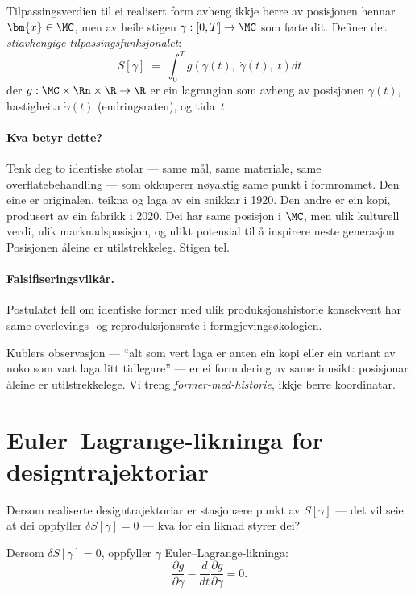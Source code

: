 \begin{postmark}\label{post:L.8.1}
Tilpassingsverdien til ei realisert form avheng ikkje berre av
posisjonen hennar $\bm{x} \in \MC$, men av heile stigen
$\gamma : [0, T] \to \MC$ som førte dit. Definer det
\emph{stiavhengige tilpassingsfunksjonalet}:
\[
  S[\gamma] \;=\; \int_0^T
    g\!\left(\gamma(t),\; \dot{\gamma}(t),\; t\right) dt
\]
der $g : \MC \times \Rn \times \R \to \R$ er ein lagrangian som
avheng av posisjonen $\gamma(t)$, hastigheita
$\dot{\gamma}(t)$ (endringsraten), og tida~$t$.
\end{postmark}

\paragraph{Kva betyr dette?}
Tenk deg to identiske stolar --- same mål, same materiale, same
overflatebehandling --- som okkuperer nøyaktig same punkt i
formrommet. Den eine er originalen, teikna og laga av ein
snikkar i 1920. Den andre er ein kopi, produsert av ein fabrikk
i 2020. Dei har same posisjon i $\MC$, men ulik kulturell verdi,
ulik marknadsposisjon, og ulikt potensial til å inspirere neste
generasjon. Posisjonen åleine er utilstrekkeleg. Stigen tel.

\paragraph{Falsifiseringsvilkår.}
Postulatet fell om identiske former med ulik produksjonshistorie
konsekvent har same overlevings- og reproduksjonsrate i
formgjevingsøkologien.

\medskip
Kublers observasjon --- ``alt som vert laga er anten ein kopi eller
ein variant av noko som vart laga litt tidlegare'' --- er ei
formulering av same innsikt: posisjonar åleine er utilstrekkelege.
Vi treng \emph{former-med-historie}, ikkje berre koordinatar.


\section{Euler--Lagrange-likninga for designtrajektoriar}

Dersom realiserte designtrajektoriar er stasjonære punkt av
$S[\gamma]$ --- det vil seie at dei oppfyller $\delta S[\gamma] = 0$
--- kva for ein liknad styrer dei?

\begin{satmark}\label{thm:L.8.2}
Dersom $\delta S[\gamma] = 0$, oppfyller $\gamma$ Euler--Lagrange-likninga:
\[
  \frac{\partial g}{\partial \gamma}
  - \frac{d}{dt}\frac{\partial g}{\partial \dot{\gamma}} = 0.
\]
\end{satmark}

